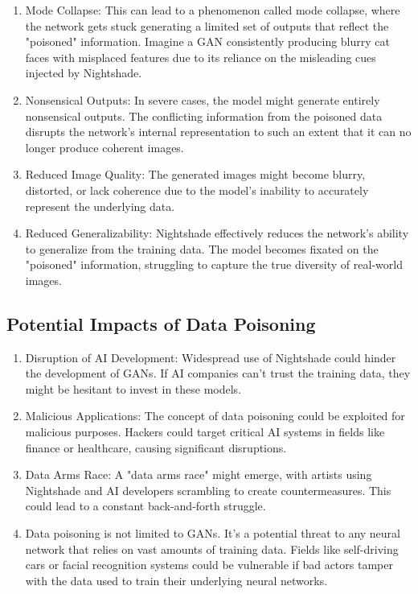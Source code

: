\documentclass{article}
\begin{document}
\begin{enumerate}
      \item Mode Collapse: This can lead to a phenomenon called mode collapse, where the
      network gets stuck generating a limited set of outputs that reflect the
      "poisoned" information. Imagine a GAN consistently producing blurry cat faces
      with misplaced features due to its reliance on the misleading cues injected by
      Nightshade.
      
      \item Nonsensical Outputs: In severe cases, the model might generate entirely
      nonsensical outputs. The conflicting information from the poisoned data
      disrupts the network's internal representation to such an extent that it can no
      longer produce coherent images.
      
      \item Reduced Image Quality: The generated images might become blurry, distorted, or
      lack coherence due to the model's inability to accurately represent the
      underlying data.
      
      \item Reduced Generalizability: Nightshade effectively reduces the network's ability
      to generalize from the training data. The model becomes fixated on the
      "poisoned" information, struggling to capture the true diversity of real-world
      images.
\end{enumerate}

\subsection{Potential Impacts of Data Poisoning}

\begin{enumerate}
      \item Disruption of AI Development: Widespread use of Nightshade could hinder the
            development of GANs. If AI companies can't trust the training data, they might
            be hesitant to invest in these models.

      \item Malicious Applications: The concept of data poisoning could be exploited for
            malicious purposes. Hackers could target critical AI systems in fields like
            finance or healthcare, causing significant disruptions.

      \item Data Arms Race: A "data arms race" might emerge, with artists using Nightshade
            and AI developers scrambling to create countermeasures. This could lead to a
            constant back-and-forth struggle.

      \item Data poisoning is not limited to GANs. It's a potential threat to any neural
            network that relies on vast amounts of training data. Fields like self-driving
            cars or facial recognition systems could be vulnerable if bad actors tamper
            with the data used to train their underlying neural networks.
\end{enumerate}
\end{document}
